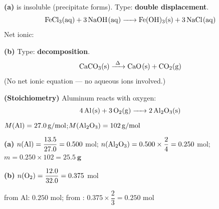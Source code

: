 \documentclass[addpoints]{exam}
\begin{document}
\begin{questions}
\begin{solution}[9cm]
\textbf{(a)}  is insoluble (precipitate forms). Type: \textbf{double displacement}.
\[
\ce{FeCl3(aq) + 3NaOH(aq) -> Fe(OH)3(s) + 3NaCl(aq)}
\]
Net ionic: 

\textbf{(b)} Type: \textbf{decomposition}.
\[
\ce{CaCO3(s) ->[\Delta] CaO(s) + CO2(g)}
\]
(No net ionic equation — no aqueous ions involved.)
\end{solution}

\question \textbf{(Stoichiometry)} Aluminum reacts with oxygen:
\[\ce{4Al(s) + 3O2(g) -> 2Al2O3(s)}\]
$M(\ce{Al}) = \SI{27.0}{g/mol}$;\quad $M(\ce{Al2O3}) = \SI{102}{g/mol}$
\begin{solution}[9cm]
\textbf{(a)} $n(\ce{Al}) = \dfrac{13.5}{27.0} = 0.500$ mol;\quad
$n(\ce{Al2O3}) = 0.500 \times \dfrac{2}{4} = 0.250$ mol;\quad
$m = 0.250 \times 102 = \mathbf{\SI{25.5}{g}}$

\textbf{(b)} $n(\ce{O2}) = \dfrac{12.0}{32.0} = 0.375$ mol

 from Al: $0.250$ mol;\quad {} from : $0.375 \times \dfrac{2}{3} = 0.250$ mol


\end{solution}
\end{questions}
\end{document}
